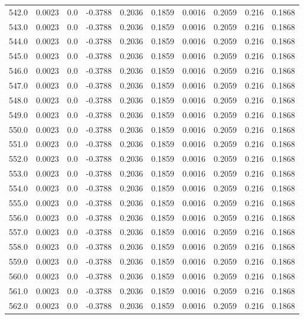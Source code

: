 \begin{longtable}{lrrrrrrrrr}
542.0 & 0.0023 & 0.0 & -0.3788 & 0.2036 & 0.1859 & 0.0016 & 0.2059 & 0.216 & 0.1868 \\
543.0 & 0.0023 & 0.0 & -0.3788 & 0.2036 & 0.1859 & 0.0016 & 0.2059 & 0.216 & 0.1868 \\
544.0 & 0.0023 & 0.0 & -0.3788 & 0.2036 & 0.1859 & 0.0016 & 0.2059 & 0.216 & 0.1868 \\
545.0 & 0.0023 & 0.0 & -0.3788 & 0.2036 & 0.1859 & 0.0016 & 0.2059 & 0.216 & 0.1868 \\
546.0 & 0.0023 & 0.0 & -0.3788 & 0.2036 & 0.1859 & 0.0016 & 0.2059 & 0.216 & 0.1868 \\
547.0 & 0.0023 & 0.0 & -0.3788 & 0.2036 & 0.1859 & 0.0016 & 0.2059 & 0.216 & 0.1868 \\
548.0 & 0.0023 & 0.0 & -0.3788 & 0.2036 & 0.1859 & 0.0016 & 0.2059 & 0.216 & 0.1868 \\
549.0 & 0.0023 & 0.0 & -0.3788 & 0.2036 & 0.1859 & 0.0016 & 0.2059 & 0.216 & 0.1868 \\
550.0 & 0.0023 & 0.0 & -0.3788 & 0.2036 & 0.1859 & 0.0016 & 0.2059 & 0.216 & 0.1868 \\
551.0 & 0.0023 & 0.0 & -0.3788 & 0.2036 & 0.1859 & 0.0016 & 0.2059 & 0.216 & 0.1868 \\
552.0 & 0.0023 & 0.0 & -0.3788 & 0.2036 & 0.1859 & 0.0016 & 0.2059 & 0.216 & 0.1868 \\
553.0 & 0.0023 & 0.0 & -0.3788 & 0.2036 & 0.1859 & 0.0016 & 0.2059 & 0.216 & 0.1868 \\
554.0 & 0.0023 & 0.0 & -0.3788 & 0.2036 & 0.1859 & 0.0016 & 0.2059 & 0.216 & 0.1868 \\
555.0 & 0.0023 & 0.0 & -0.3788 & 0.2036 & 0.1859 & 0.0016 & 0.2059 & 0.216 & 0.1868 \\
556.0 & 0.0023 & 0.0 & -0.3788 & 0.2036 & 0.1859 & 0.0016 & 0.2059 & 0.216 & 0.1868 \\
557.0 & 0.0023 & 0.0 & -0.3788 & 0.2036 & 0.1859 & 0.0016 & 0.2059 & 0.216 & 0.1868 \\
558.0 & 0.0023 & 0.0 & -0.3788 & 0.2036 & 0.1859 & 0.0016 & 0.2059 & 0.216 & 0.1868 \\
559.0 & 0.0023 & 0.0 & -0.3788 & 0.2036 & 0.1859 & 0.0016 & 0.2059 & 0.216 & 0.1868 \\
560.0 & 0.0023 & 0.0 & -0.3788 & 0.2036 & 0.1859 & 0.0016 & 0.2059 & 0.216 & 0.1868 \\
561.0 & 0.0023 & 0.0 & -0.3788 & 0.2036 & 0.1859 & 0.0016 & 0.2059 & 0.216 & 0.1868 \\
562.0 & 0.0023 & 0.0 & -0.3788 & 0.2036 & 0.1859 & 0.0016 & 0.2059 & 0.216 & 0.1868 \\

\end{longtable}
